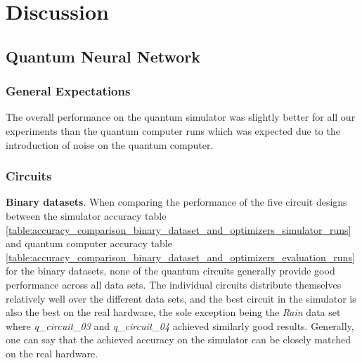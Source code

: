 \chapter{Discussion} %

\label{chapter:discussion} %




\section{Quantum Neural Network}

\subsection{General Expectations}
The overall performance on the quantum simulator was slightly better for all our experiments than the quantum computer runs which was expected due to the introduction of noise on the quantum computer.

\subsection{Circuits}
\textbf{Binary datasets}. When comparing the performance of the five circuit designs between the simulator accuracy table \ref{table:accuracy_comparison_binary_dataset_and_optimizers_simulator_runs} and quantum computer accuracy table \ref{table:accuracy_comparison_binary_dataset_and_optimizers_evaluation_runs} for the binary datasets, none of the quantum circuits generally provide good performance across all data sets. The individual circuits distribute themselves relatively well over the different data sets, and the best circuit in the simulator is also the best on the real hardware, the sole exception being the \textit{Rain} data set where \textit{q\_circuit\_03} and \textit{q\_circuit\_04} achieved similarly good results. Generally, one can say that the achieved accuracy on the simulator can be closely matched on the real hardware.

